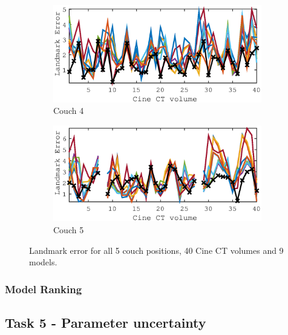 \documentclass[11pt,a4paper,oneside]{report}
\begin{document}
\begin{figure}[H]
  \begin{subfigure}[b]{0.5\textwidth}
    \includegraphics[width=\textwidth, trim=0 0 0 0,clip=true]{figures/task4/landmark_error_couch4.eps}
    \caption{Couch 4}
  \end{subfigure}%
  \begin{subfigure}[b]{0.5\textwidth}
    \includegraphics[width=\textwidth, trim=0 0 0 0,clip=true]{figures/task4/landmark_error_couch5.eps}
    \caption{Couch 5}
  \end{subfigure}%
  
  \caption{Landmark error for all 5 couch positions, 40 Cine CT volumes and 9 models.}
  \label{fig:c4landError}
  
\end{figure}

\subsubsection*{Model Ranking}


\subsection*{Task 5 - Parameter uncertainty}
\end{document}
